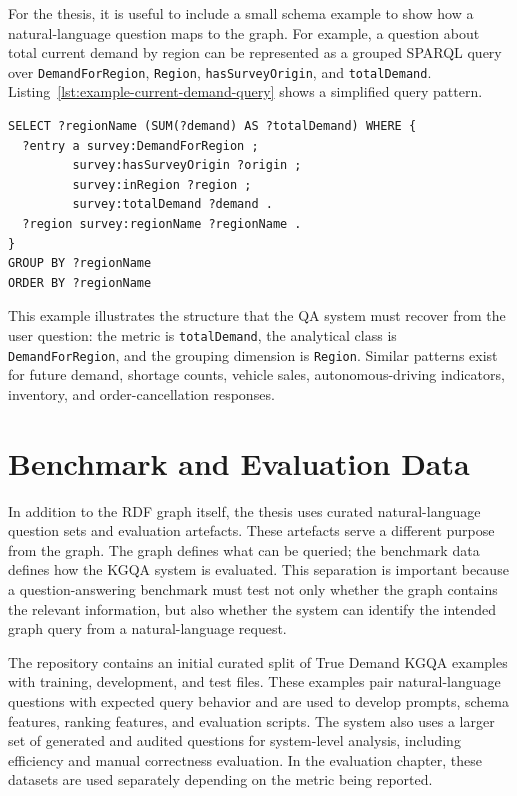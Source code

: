 \documentclass[
  12pt,
  english,
  oneside]{report}
\begin{document}
For the thesis, it is useful to include a small schema example to show how a natural-language question maps to the graph. For example, a question about total current demand by region can be represented as a grouped SPARQL query over \texttt{DemandForRegion}, \texttt{Region}, \texttt{hasSurveyOrigin}, and \texttt{totalDemand}. Listing~\ref{lst:example-current-demand-query} shows a simplified query pattern.

\begin{lstlisting}[caption={Example graph-supported SPARQL query pattern for current demand by region.}, label={lst:example-current-demand-query}]
SELECT ?regionName (SUM(?demand) AS ?totalDemand) WHERE {
  ?entry a survey:DemandForRegion ;
         survey:hasSurveyOrigin ?origin ;
         survey:inRegion ?region ;
         survey:totalDemand ?demand .
  ?region survey:regionName ?regionName .
}
GROUP BY ?regionName
ORDER BY ?regionName
\end{lstlisting}

This example illustrates the structure that the QA system must recover from the user question: the metric is \texttt{totalDemand}, the analytical class is \texttt{DemandForRegion}, and the grouping dimension is \texttt{Region}. Similar patterns exist for future demand, shortage counts, vehicle sales, autonomous-driving indicators, inventory, and order-cancellation responses.

\section{Benchmark and Evaluation Data}
\label{sec:benchmark-evaluation-data}

In addition to the RDF graph itself, the thesis uses curated natural-language question sets and evaluation artefacts. These artefacts serve a different purpose from the graph. The graph defines what can be queried; the benchmark data defines how the KGQA system is evaluated. This separation is important because a question-answering benchmark must test not only whether the graph contains the relevant information, but also whether the system can identify the intended graph query from a natural-language request.

The repository contains an initial curated split of True Demand KGQA examples with training, development, and test files. These examples pair natural-language questions with expected query behavior and are used to develop prompts, schema features, ranking features, and evaluation scripts. The system also uses a larger set of generated and audited questions for system-level analysis, including efficiency and manual correctness evaluation. In the evaluation chapter, these datasets are used separately depending on the metric being reported.
\end{document}
